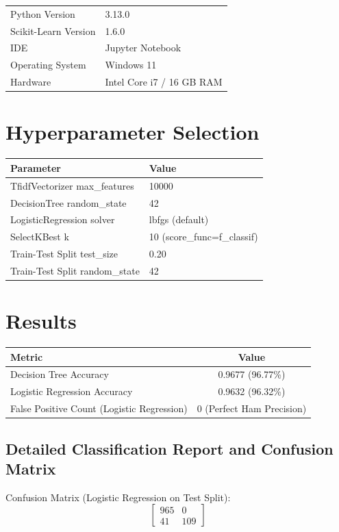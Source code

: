 \documentclass[12pt,a4paper]{article}
\begin{document}
\begin{tabular}{ll}
\toprule
Python Version & 3.13.0 \\
Scikit-Learn Version & 1.6.0 \\
IDE & Jupyter Notebook \\
Operating System & Windows 11 \\
Hardware & Intel Core i7 / 16 GB RAM \\
\bottomrule
\end{tabular}

\section{Hyperparameter Selection}

\begin{tabular}{ll}
\toprule
Parameter & Value\\
\midrule
TfidfVectorizer max\_features & 10000 \\
DecisionTree random\_state & 42 \\
LogisticRegression solver & lbfgs (default) \\
SelectKBest k & 10 (score\_func=f\_classif) \\
Train-Test Split test\_size & 0.20 \\
Train-Test Split random\_state & 42 \\
\bottomrule
\end{tabular}

\section{Results}

\begin{tabular}{lc}
\toprule
Metric & Value\\
\midrule
Decision Tree Accuracy & 0.9677 (96.77\%) \\
Logistic Regression Accuracy & 0.9632 (96.32\%) \\
False Positive Count (Logistic Regression) & 0 (Perfect Ham Precision) \\
\bottomrule
\end{tabular}

\subsection*{Detailed Classification Report and Confusion Matrix}

Confusion Matrix (Logistic Regression on Test Split):
\begin{equation*}
\begin{bmatrix}
965 & 0 \\
41 & 109
\end{bmatrix}
\end{equation*}
\end{document}
